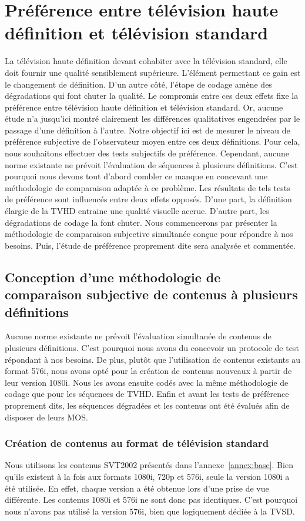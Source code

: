 \section{Préférence entre télévision haute définition et télévision standard} \label{sec:hdVSsd}
La télévision haute définition devant cohabiter avec la télévision standard, elle doit fournir une qualité sensiblement supérieure. L'élément permettant ce gain est le changement de définition. D'un autre côté, l'étape de codage amène des dégradations qui font chuter la qualité. Le compromis entre ces deux effets fixe la préférence entre télévision haute définition et télévision standard. Or, aucune étude n'a jusqu'ici montré clairement les différences qualitatives engendrées par le passage d'une définition à l'autre. Notre objectif ici est de mesurer le niveau de préférence subjective de l'observateur moyen entre ces deux définitions. Pour cela, nous souhaitons effectuer des tests subjectifs de préférence. Cependant, aucune norme existante ne prévoit l'évaluation de séquences à plusieurs définitions. C'est pourquoi nous devons tout d'abord combler ce manque en concevant une méthodologie de comparaison adaptée à ce problème. Les résultats de tels tests de préférence sont influencés entre deux effets opposés. D'une part, la définition élargie de la TVHD entraine une qualité visuelle accrue. D'autre part, les dégradations de codage la font chuter. Nous commencerons par présenter la méthodologie de comparaison subjective simultanée conçue pour répondre à nos besoins. Puis, l'étude de préférence proprement dite sera analysée et commentée.


\subsection{Conception d'une méthodologie de comparaison subjective de contenus à plusieurs définitions}
Aucune norme existante ne prévoit l'évaluation simultanée de contenus de plusieurs définitions. C'est pourquoi nous avons du concevoir un protocole de test répondant à nos besoins. De plus, plutôt que l'utilisation de contenus existants au format 576i, nous avons opté pour la création de contenus nouveaux à partir de leur version 1080i. Nous les avons ensuite codés avec la même méthodologie de codage que pour les séquences de TVHD. Enfin et avant les tests de préférence proprement dits, les séquences dégradées et les contenus ont été évalués afin de disposer de leurs MOS.


\subsubsection{Création de contenus au format de télévision standard}
Nous utilisons les contenus SVT2002 présentés dans l'annexe~\ref{annex:base}. Bien qu'ils existent à la fois aux formats 1080i, 720p et 576i, seule la version 1080i a été utilisée. En effet, chaque version a été obtenue lors d'une prise de vue différente. Les contenus 1080i et 576i ne sont donc pas identiques. C'est pourquoi nous n'avons pas utilisé la version 576i, bien que logiquement dédiée à la TVSD.

